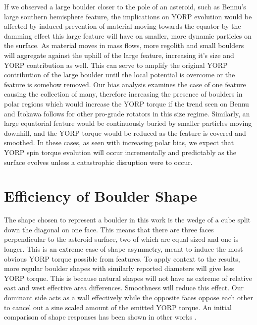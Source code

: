 If we observed a large boulder closer to the pole of an asteroid, such as Bennu's large southern hemisphere feature, the implications on YORP evolution would be affected by induced prevention of material moving towards the equator by the damming effect this large feature will have on smaller, more dynamic particles on the surface. As material moves in mass flows, more regolith and small boulders will aggregate against the uphill of the large feature, increasing it's size and YORP contribution as well. This can serve to amplify the original YORP contribution of the large boulder until the local potential is overcome or the feature is somehow removed. Our bias analysis examines the case of one feature causing the collection of many, therefore increasing the presence of boulders in polar regions which would increase the YORP torque if the trend seen on Bennu and Itokawa follows for other pro-grade rotators in this size regime. Similarly, an large equatorial feature would be continuously buried by smaller particles moving downhill, and the YORP torque would be reduced as the feature is covered and smoothed. In these cases, as seen with increasing polar bias, we expect that YORP spin torque evolution will occur incrementally and predictably as the surface evolves unless a catastrophic disruption were to occur. 


\section{Efficiency of Boulder Shape}

The shape chosen to represent a boulder in this work is the wedge of a cube split down the diagonal on one face. This means that there are three faces perpendicular to the asteroid surface, two of which are equal sized and one is longer. This is an extreme case of shape asymmetry, meant to induce the most obvious YORP torque possible from features. To apply context to the results, more regular boulder shapes with similarly reported diameters will give less YORP torque. This is because natural shapes will not have as extreme of relative east and west effective area differences. Smoothness will reduce this effect. Our dominant side acts as a wall effectively while the opposite faces oppose each other to cancel out a sine scaled amount of the emitted YORP torque. An initial comparison of shape responses has been shown in other works \citep{Golubov,2017}. 






